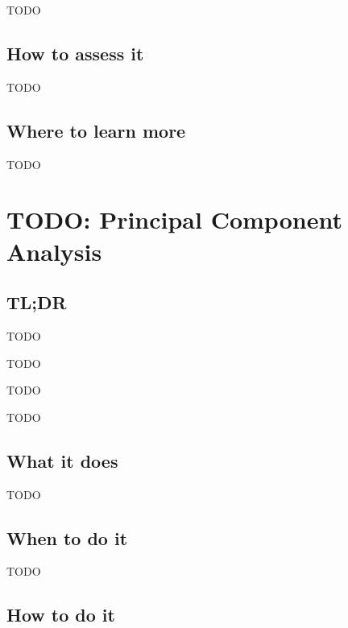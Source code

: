 \documentclass[
]{book}
\providecommand{\tightlist}{%
  \setlength{\itemsep}{0pt}\setlength{\parskip}{0pt}}
\begin{document}
TODO

\hypertarget{how-to-assess-it-20}{%
\section{How to assess it}\label{how-to-assess-it-20}}

TODO

\hypertarget{where-to-learn-more-20}{%
\section{Where to learn more}\label{where-to-learn-more-20}}

TODO

\hypertarget{principal-component-analysis}{%
\chapter{TODO: Principal Component Analysis}\label{principal-component-analysis}}

\hypertarget{tldr-21}{%
\section{TL;DR}\label{tldr-21}}

\begin{description}
\tightlist
\item[What it does]
TODO
\item[When to do it]
TODO
\item[How to do it]
TODO
\item[How to assess it]
TODO
\end{description}

\hypertarget{what-it-does-21}{%
\section{What it does}\label{what-it-does-21}}

TODO

\hypertarget{when-to-do-it-21}{%
\section{When to do it}\label{when-to-do-it-21}}

TODO

\hypertarget{how-to-do-it-21}{%
\section{How to do it}\label{how-to-do-it-21}}
\end{document}
